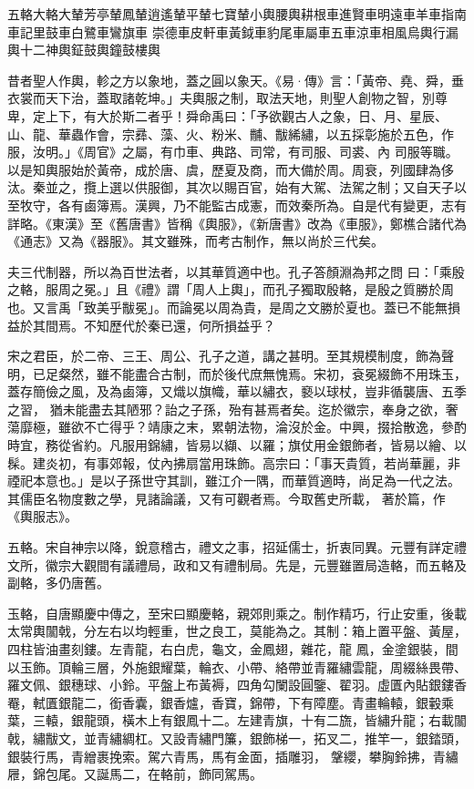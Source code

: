 
\begin{pinyinscope}

 五輅大輅大輦芳亭輦鳳輦逍遙輦平輦七寶輦小輿腰輿耕根車進賢車明遠車羊車指南車記里鼓車白鷺車鸞旗車
 崇德車皮軒車黃鉞車豹尾車屬車五車涼車相風烏輿行漏輿十二神輿鉦鼓輿鐘鼓樓輿



 昔者聖人作輿，軫之方以象地，蓋之圓以象天。《易·傳》言：「黃帝、堯、舜，垂衣裳而天下治，蓋取諸乾坤。」夫輿服之制，取法天地，則聖人創物之智，別尊卑，定上下，有大於斯二者乎！舜命禹曰：「予欲觀古人之象，日、月、星辰、山、龍、華蟲作會，宗彞、藻、火、粉米、黼、黻絺繡，以五採彰施於五色，作服，汝明。」《周官》之屬，有巾車、典路、司常，有司服、司裘、內
 司服等職。以是知輿服始於黃帝，成於唐、虞，歷夏及商，而大備於周。周衰，列國肆為侈汰。秦並之，攬上選以供服御，其次以賜百官，始有大駕、法駕之制；又自天子以至牧守，各有鹵簿焉。漢興，乃不能監古成憲，而效秦所為。自是代有變更，志有詳略。《東漢》至《舊唐書》皆稱《輿服》，《新唐書》改為《車服》，鄭樵合諸代為《通志》又為《器服》。其文雖殊，而考古制作，無以尚於三代矣。



 夫三代制器，所以為百世法者，以其華質適中也。孔子答顏淵為邦之問
 曰：「乘殷之輅，服周之冕。」且《禮》謂「周人上輿」，而孔子獨取殷輅，是殷之質勝於周也。又言禹「致美乎黻冕」。而論冕以周為貴，是周之文勝於夏也。蓋已不能無損益於其間焉。不知歷代於秦已還，何所損益乎？



 宋之君臣，於二帝、三王、周公、孔子之道，講之甚明。至其規模制度，飾為聲明，已足粲然，雖不能盡合古制，而於後代庶無愧焉。宋初，袞冕綴飾不用珠玉，蓋存簡儉之風，及為鹵簿，又熾以旗幟，華以繡衣，褻以球杖，豈非循襲唐、五季之習，
 猶未能盡去其陋邪？詒之子孫，殆有甚焉者矣。迄於徽宗，奉身之欲，奢蕩靡極，雖欲不亡得乎？靖康之末，累朝法物，淪沒於金。中興，掇拾散逸，參酌時宜，務從省約。凡服用錦繡，皆易以纈、以羅；旗仗用金銀飾者，皆易以繪、以髹。建炎初，有事郊報，仗內拂扇當用珠飾。高宗曰：「事天貴質，若尚華麗，非禋祀本意也。」是以子孫世守其訓，雖江介一隅，而華質適時，尚足為一代之法。其儒臣名物度數之學，見諸論議，又有可觀者焉。今取舊史所載，
 著於篇，作《輿服志》。



 五輅。宋自神宗以降，銳意稽古，禮文之事，招延儒士，折衷同異。元豐有詳定禮文所，徽宗大觀間有議禮局，政和又有禮制局。先是，元豐雖置局造輅，而五輅及副輅，多仍唐舊。



 玉輅，自唐顯慶中傳之，至宋曰顯慶輅，親郊則乘之。制作精巧，行止安重，後載太常輿闟戟，分左右以均輕重，世之良工，莫能為之。其制：箱上置平盤、黃屋，四柱皆油畫刻鏤。左青龍，右白虎，龜文，金鳳翅，雜花，龍
 鳳，金塗銀裝，間以玉飾。頂輪三層，外施銀耀葉，輪衣、小帶、絡帶並青羅繡雲龍，周綴絲畏帶、羅文佩、銀穗球、小鈴。平盤上布黃褥，四角勾闌設圓鑒、翟羽。虛匱內貼銀鏤香罨，軾匱銀龍二，銜香囊，銀香爐，香寶，錦帶，下有障塵。青畫輪轅，銀轂乘葉，三轅，銀龍頭，橫木上有銀鳳十二。左建青旗，十有二旒，皆繡升龍；右載闟戟，繡黻文，並青繡綢杠。又設青繡門簾，銀飾梯一，拓叉二，推竿一，銀錔頭，銀裝行馬，青繒裹挽索。駕六青馬，馬有金面，插雕羽，
 鞶纓，攀胸鈴拂，青繡屜，錦包尾。又誕馬二，在輅前，飾同駕馬。




\end{pinyinscope}
